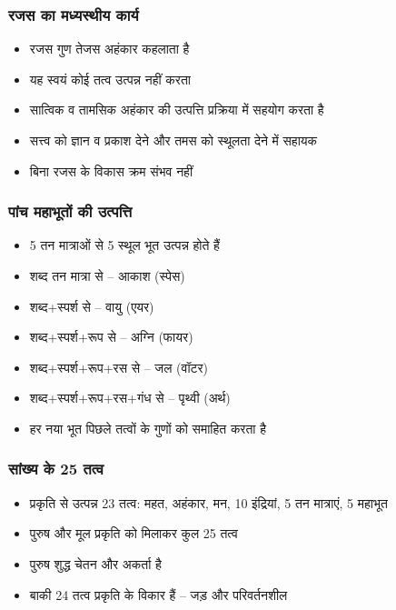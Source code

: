 \begin{frame}[fragile]\frametitle{रजस का मध्यस्थीय कार्य}
\begin{itemize}
  \item रजस गुण तेजस अहंकार कहलाता है
  \item यह स्वयं कोई तत्व उत्पन्न नहीं करता
  \item सात्विक व तामसिक अहंकार की उत्पत्ति प्रक्रिया में सहयोग करता है
  \item सत्त्व को ज्ञान व प्रकाश देने और तमस को स्थूलता देने में सहायक
  \item बिना रजस के विकास क्रम संभव नहीं
\end{itemize}
\end{frame}

\begin{frame}[fragile]\frametitle{पांच महाभूतों की उत्पत्ति}
\begin{itemize}
  \item 5 तन मात्राओं से 5 स्थूल भूत उत्पन्न होते हैं
  \item शब्द तन मात्रा से – आकाश (स्पेस)
  \item शब्द+स्पर्श से – वायु (एयर)
  \item शब्द+स्पर्श+रूप से – अग्नि (फायर)
  \item शब्द+स्पर्श+रूप+रस से – जल (वॉटर)
  \item शब्द+स्पर्श+रूप+रस+गंध से – पृथ्वी (अर्थ)
  \item हर नया भूत पिछले तत्वों के गुणों को समाहित करता है
\end{itemize}
\end{frame}

\begin{frame}[fragile]\frametitle{सांख्य के 25 तत्व}
\begin{itemize}
  \item प्रकृति से उत्पन्न 23 तत्व: महत, अहंकार, मन, 10 इंद्रियां, 5 तन मात्राएं, 5 महाभूत
  \item पुरुष और मूल प्रकृति को मिलाकर कुल 25 तत्व
  \item पुरुष शुद्ध चेतन और अकर्ता है
  \item बाकी 24 तत्व प्रकृति के विकार हैं – जड़ और परिवर्तनशील
\end{itemize}
\end{frame}

